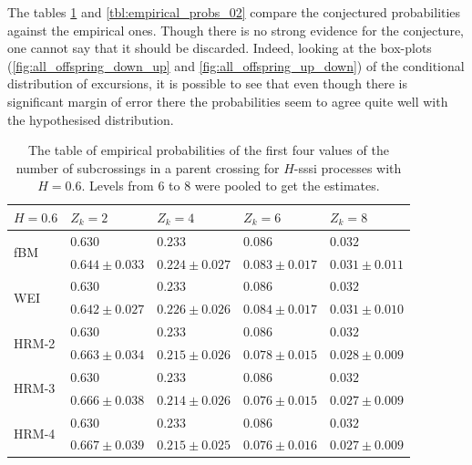 \documentclass[a4paper]{article}
\begin{document}
The tables \ref{tbl:empirical_probs_01} and \ref{tbl:empirical_probs_02} compare the 
conjectured probabilities against the empirical ones. Though there is no strong evidence
for the conjecture, one cannot say that it should be discarded. Indeed, looking at
the box-plots (\ref{fig:all_offspring_down_up} and \ref{fig:all_offspring_up_down})
of the conditional distribution of excursions, it is possible to see that even
though there is significant margin of error there the probabilities seem to agree
quite well with the hypothesised distribution.
\begin{table}[h]\begin{center}
	\begin{tabular}{l||l|l|l|l|}
					$H=0.6$ & $Z_k = 2$ & $Z_k = 4$ & $Z_k = 6$ & $Z_k = 8$ \\ \hline\hline
	\multirow{2}{*}{fBM} 	& $0.630$ & $0.233$ & $0.086$ & $0.032$ \\ \cline{2-5}
							& $0.644\pm0.033$ & $0.224\pm0.027$ & $0.083\pm0.017$ & $0.031\pm0.011$ \\ \hline\hline
	\multirow{2}{*}{WEI} 	& $0.630$ & $0.233$ & $0.086$ & $0.032$ \\ \cline{2-5}
							& $0.642\pm0.027$ & $0.226\pm0.026$ & $0.084\pm0.017$ & $0.031\pm0.010$ \\ \hline\hline
	\multirow{2}{*}{HRM-2} 	& $0.630$ & $0.233$ & $0.086$ & $0.032$ \\ \cline{2-5}
							& $0.663\pm0.034$ & $0.215\pm0.026$ & $0.078\pm0.015$ & $0.028\pm0.009$ \\ \hline\hline
	\multirow{2}{*}{HRM-3} 	& $0.630$ & $0.233$ & $0.086$ & $0.032$ \\ \cline{2-5}
							& $0.666\pm0.038$ & $0.214\pm0.026$ & $0.076\pm0.015$ & $0.027\pm0.009$ \\ \hline\hline
	\multirow{2}{*}{HRM-4} 	& $0.630$ & $0.233$ & $0.086$ & $0.032$ \\ \cline{2-5}
							& $0.667\pm0.039$ & $0.215\pm0.025$ & $0.076\pm0.016$ & $0.027\pm0.009$ \\ \hline\hline
	\end{tabular}
	\caption{The table of empirical probabilities of the first four values of the number
	of subcrossings in a parent crossing for $H$-sssi processes with $H=0.6$. Levels from
	6 to 8 were pooled to get the estimates.}
\label{tbl:empirical_probs_01}
\end{center}\end{table}
\end{document}
